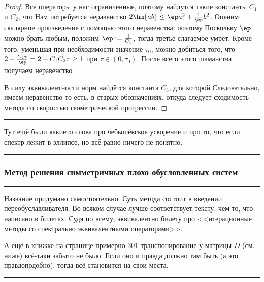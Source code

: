 \documentclass[a4paper]{article}
\newenvironment{petit}{\medskip\hrule\smallskip\footnotesize}{\par\smallskip\hrule\medskip}
\begin{document}
\begin{proof}
Все операторы у нас ограниченные, поэтому найдутся такие константы $C_1$ и $C_2$, что
Нам потребуется неравенство $2\hm{ab} \le \ep a^2 + \frac1\ep b^2$.
Оценим скалярное произведение с помощью этого неравенства:
поэтому
Поскольку $\ep$ можно брать любым, положим $\ep := \frac1{C_1}$, тогда третье слагаемое умрёт.
Кроме того, уменьшая при необходимости значение $\tau_0$, можно добиться того, что
$2 - \frac{C_2\tau}{\ep} = 2 - C_1C_2\tau \ge 1$ при $\tau \in (0,\tau_0)$.
После всего этого шаманства получаем неравенство

В силу эквивалентности норм найдётся константа $C_3$, для которой
Следовательно, имеем неравенство
то есть, в старых обозначениях,
откуда следует сходимость метода со скоростью геометрической прогрессии.
\end{proof}

\begin{petit}
Тут ещё были какие\д то слова про чебышёвское ускорение и про то, что если спектр лежит в эллипсе,
но всё равно ничего не понятно.
\end{petit}


\subsubsection{Метод решения симметричных плохо обусловленных систем}

\begin{petit}
Название придумано самостоятельно. Суть метода состоит в введении переобуславливателя.
Во всяком случае лучше соответствует тексту, чем то, что написано в билетах.
Судя по всему, эквивалентно билету про <<итерационные методы со спектрально эквивалентными операторами>>.

А ещё в книжке на странице примерно 301 транспонирование у матрицы $D$ (см. ниже) всё-таки забыто не было.
Если оно и правда должно там быть (а это правдоподобно), тогда всё становится на свои места.
\end{petit}
\end{document}
